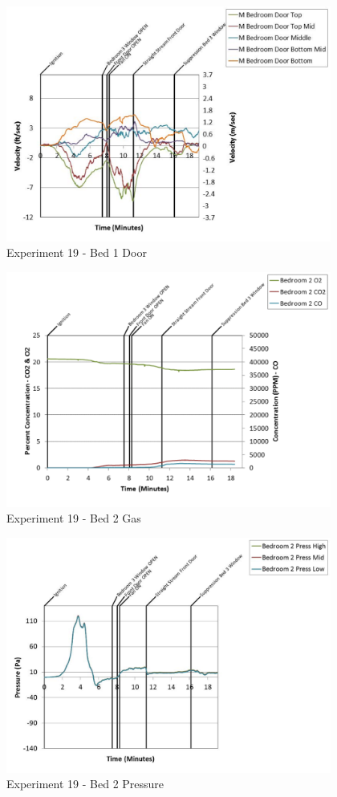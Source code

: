 \documentclass{article}
\begin{document}
\begin{appendices}
	\clearpage

	\begin{figure}[h!]
		\centering
		\includegraphics[height=3.05in]{0_Images/Results_Charts/Exp_19_Charts/Bed1Door.pdf}
		\caption{Experiment 19 - Bed 1 Door}
	\end{figure}
 

	\begin{figure}[h!]
		\centering
		\includegraphics[height=3.05in]{0_Images/Results_Charts/Exp_19_Charts/Bed2Gas.pdf}
		\caption{Experiment 19 - Bed 2 Gas}
	\end{figure}
 
	\clearpage

	\begin{figure}[h!]
		\centering
		\includegraphics[height=3.05in]{0_Images/Results_Charts/Exp_19_Charts/Bed2Pressure.pdf}
		\caption{Experiment 19 - Bed 2 Pressure}
	\end{figure}
 


\end{appendices}
\end{document}
